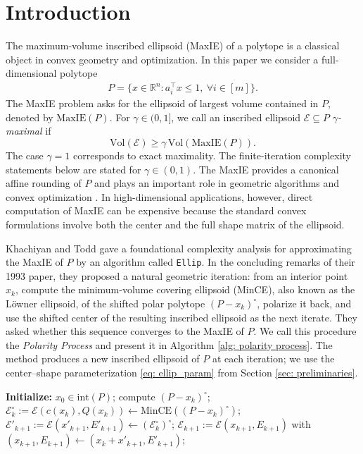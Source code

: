 \documentclass[smallextended]{svjour3}
\newcommand{\R}{\mathbb{R}}
\newcommand{\E}{\mathcal{E}}
\newcommand{\Vol}{\mathrm{Vol}}
\begin{document}
\section{Introduction}\label{sec:introduction}
The maximum-volume inscribed ellipsoid (MaxIE) of a polytope is a classical
object in convex geometry and optimization. In this paper we consider a
full-dimensional polytope
\begin{align}\label{eq: polytope}
    P = \{x \in \R^n : a_i^\top x \leq 1,\ \forall i\in[m]\}.
\end{align}
The MaxIE problem asks for the ellipsoid of largest volume contained in $P$,
denoted by $\mathrm{MaxIE}(P)$. For $\gamma\in(0,1]$, we call an inscribed ellipsoid $\E\subseteq P$
\emph{$\gamma$-maximal} if
\[
    \Vol(\E)\geq \gamma\,\Vol(\mathrm{MaxIE}(P)).
\]
The case $\gamma=1$ corresponds to exact maximality. The finite-iteration
complexity statements below are stated for $\gamma\in(0,1)$.
The MaxIE provides a canonical affine rounding of $P$ and plays an important
role in geometric algorithms and convex optimization
\cite{grotschel1988geometric,john1948extremum,khachiyan1990complexity}. In
high-dimensional applications, however, direct computation of MaxIE can be
expensive because the standard convex formulations involve both the center and
the full shape matrix of the ellipsoid.

Khachiyan and Todd \cite{khachiyan1990complexity} gave a foundational
complexity analysis for approximating the MaxIE of $P$ by an algorithm called \texttt{Ellip}.
In the concluding remarks of their 1993 paper, they proposed a natural geometric iteration: from
an interior point $x_k$, compute the minimum-volume covering ellipsoid (MinCE),
also known as the L\"owner ellipsoid,
of the shifted polar polytope $(P-x_k)^\circ$, polarize it back, and use the
shifted center of the resulting inscribed ellipsoid as the next iterate. They asked
whether this sequence converges to the MaxIE of $P$. We call this procedure the \emph{Polarity Process} and present it in Algorithm
\ref{alg: polarity process}. The method produces a new inscribed ellipsoid of
$P$ at each iteration; we use the center--shape parameterization
\eqref{eq: ellip_param} from Section
\ref{sec: preliminaries}.

\begin{algorithm}[h]
\caption{The Polarity Process}
\label{alg: polarity process}
\begin{algorithmic}[1]
\State \textbf{Initialize:} $x_0 \in \mathrm{int}(P)$; 
\State compute $(P-x_k)^\circ$; 
\State $\mathcal{E}_k^\circ := \E(c(x_k), Q(x_k)) \gets \mathrm{MinCE}((P-x_k)^\circ)$; 
\State $\mathcal{E}'_{k+1}:=\E(x'_{k+1}, E'_{k+1}) \gets \left(\mathcal{E}_k^\circ\right)^\circ$; 
\State $\mathcal{E}_{k+1}:= \E(x_{k+1}, E_{k+1})$ with $(x_{k+1},E_{k+1} ) \gets (x_k + x'_{k+1}, E'_{k+1})$; 
\EndFor
\end{algorithmic}
\end{algorithm}
\end{document}
